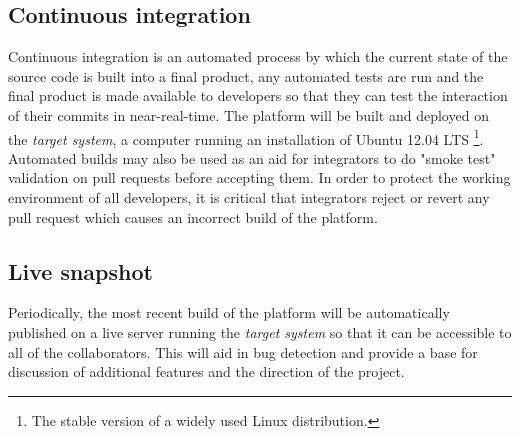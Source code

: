 \subsection{Continuous integration}
\label{sec:continuous-integration}

Continuous integration is an automated process by which the current state of the source code is
built into a final product, any automated tests are run and the final product is made available
to developers so that they can test the interaction of their commits in near-real-time. The platform
will be built and deployed on the \emph{target system}, a computer running an installation of
Ubuntu 12.04 LTS \footnote{The stable version of a widely used Linux distribution.}.
Automated builds may also be used as an aid for integrators to do "smoke test" validation on pull
requests before accepting them. In order to protect the working environment of all developers,
it is critical that integrators reject or revert any pull request which causes an incorrect build
of the platform.

\subsection{Live snapshot}
\label{sec:live-snapshot}

Periodically, the most recent build of the \learnpad platform will be automatically published
on a live server running the \emph{target system} so that it can be accessible to all of the
collaborators. This will aid in bug detection and provide a base for discussion of additional
features and the direction of the project.
